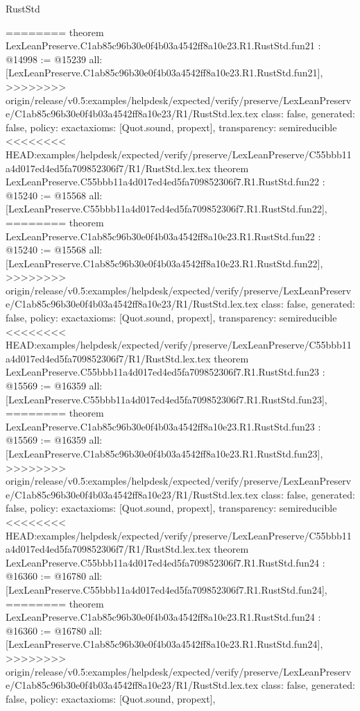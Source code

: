 \begin{lexlean}{RustStd}
\begin{coremodule}
{\begin{coremodule}
{{{{{{{{{{{{{{{{{{{{{{{{========
theorem LexLeanPreserve.C1ab85c96b30e0f4b03a4542ff8a10e23.R1.RustStd.fun21 : @14998 := @15239 {
  all: [LexLeanPreserve.C1ab85c96b30e0f4b03a4542ff8a10e23.R1.RustStd.fun21],
>>>>>>>> origin/release/v0.5:examples/helpdesk/expected/verify/preserve/LexLeanPreserve/C1ab85c96b30e0f4b03a4542ff8a10e23/R1/RustStd.lex.tex
  class: false,
  generated: false,
  policy: exact{axioms: [Quot.sound, propext]},
  transparency: semireducible
}
<<<<<<<< HEAD:examples/helpdesk/expected/verify/preserve/LexLeanPreserve/C55bbb11a4d017ed4ed5fa709852306f7/R1/RustStd.lex.tex
theorem LexLeanPreserve.C55bbb11a4d017ed4ed5fa709852306f7.R1.RustStd.fun22 : @15240 := @15568 {
  all: [LexLeanPreserve.C55bbb11a4d017ed4ed5fa709852306f7.R1.RustStd.fun22],
========
theorem LexLeanPreserve.C1ab85c96b30e0f4b03a4542ff8a10e23.R1.RustStd.fun22 : @15240 := @15568 {
  all: [LexLeanPreserve.C1ab85c96b30e0f4b03a4542ff8a10e23.R1.RustStd.fun22],
>>>>>>>> origin/release/v0.5:examples/helpdesk/expected/verify/preserve/LexLeanPreserve/C1ab85c96b30e0f4b03a4542ff8a10e23/R1/RustStd.lex.tex
  class: false,
  generated: false,
  policy: exact{axioms: [Quot.sound, propext]},
  transparency: semireducible
}
<<<<<<<< HEAD:examples/helpdesk/expected/verify/preserve/LexLeanPreserve/C55bbb11a4d017ed4ed5fa709852306f7/R1/RustStd.lex.tex
theorem LexLeanPreserve.C55bbb11a4d017ed4ed5fa709852306f7.R1.RustStd.fun23 : @15569 := @16359 {
  all: [LexLeanPreserve.C55bbb11a4d017ed4ed5fa709852306f7.R1.RustStd.fun23],
========
theorem LexLeanPreserve.C1ab85c96b30e0f4b03a4542ff8a10e23.R1.RustStd.fun23 : @15569 := @16359 {
  all: [LexLeanPreserve.C1ab85c96b30e0f4b03a4542ff8a10e23.R1.RustStd.fun23],
>>>>>>>> origin/release/v0.5:examples/helpdesk/expected/verify/preserve/LexLeanPreserve/C1ab85c96b30e0f4b03a4542ff8a10e23/R1/RustStd.lex.tex
  class: false,
  generated: false,
  policy: exact{axioms: [Quot.sound, propext]},
  transparency: semireducible
}
<<<<<<<< HEAD:examples/helpdesk/expected/verify/preserve/LexLeanPreserve/C55bbb11a4d017ed4ed5fa709852306f7/R1/RustStd.lex.tex
theorem LexLeanPreserve.C55bbb11a4d017ed4ed5fa709852306f7.R1.RustStd.fun24 : @16360 := @16780 {
  all: [LexLeanPreserve.C55bbb11a4d017ed4ed5fa709852306f7.R1.RustStd.fun24],
========
theorem LexLeanPreserve.C1ab85c96b30e0f4b03a4542ff8a10e23.R1.RustStd.fun24 : @16360 := @16780 {
  all: [LexLeanPreserve.C1ab85c96b30e0f4b03a4542ff8a10e23.R1.RustStd.fun24],
>>>>>>>> origin/release/v0.5:examples/helpdesk/expected/verify/preserve/LexLeanPreserve/C1ab85c96b30e0f4b03a4542ff8a10e23/R1/RustStd.lex.tex
  class: false,
  generated: false,
  policy: exact{axioms: [Quot.sound, propext]},
}}}}}}}}}}}}}}}}}}}}}}}}}}}}
\end{coremodule}}
\end{coremodule}
\end{lexlean}

